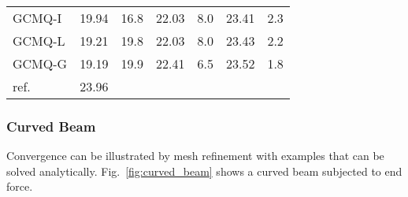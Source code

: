 \documentclass[3p,sort&compress,review,11pt]{elsarticle}
\newcommand*{\figref}[1]{Fig.~\ref{#1}}
\begin{document}
\begin{table}[htb]
\begin{tabular}{lrrrrrr}
	GCMQ-I                 & 19.94 &               16.8 & 22.03 &                8.0 & 23.41 &                2.3 \\
	GCMQ-L                 & 19.21 &               19.8 & 22.03 &                8.0 & 23.43 &                2.2 \\
	GCMQ-G                 & 19.19 &               19.9 & 22.41 &                6.5 & 23.52 &                1.8 \\  \midrule
	ref.                   & 23.96 &                    &       &                    &       &                    \\ \bottomrule
\end{tabular}
\end{table}
\subsubsection{Curved Beam}
Convergence can be illustrated by mesh refinement with examples that can be solved analytically. \figref{fig:curved_beam} shows a curved beam subjected to end force.
\end{document}
